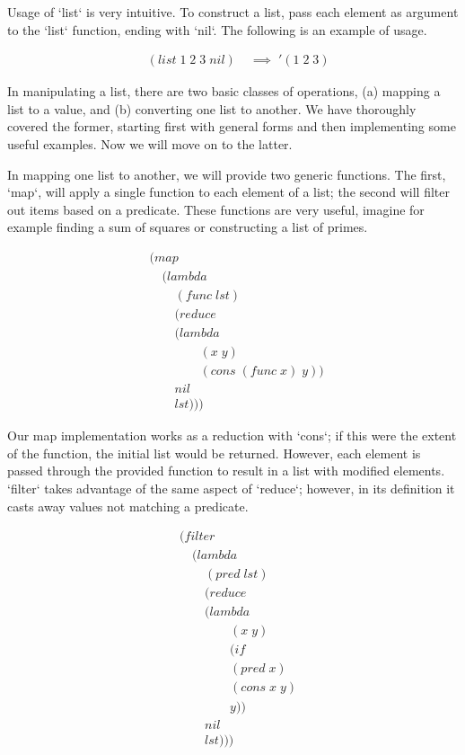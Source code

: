 \documentclass[11pt]{article}
\begin{document}
Usage of `list` is very intuitive. To construct a list, pass each element as argument to the `list` function, ending with `nil`. The following is an example of usage.   

\begin{align*}
& (list \; 1 \; 2 \; 3 \; nil) \; &\implies \; '(1 \; 2 \; 3)
\end{align*}

In manipulating a list, there are two basic classes of operations, (a) mapping a list to a value, and (b) converting one list to another. We have thoroughly covered the former, starting first with general forms and then implementing some useful examples. Now we will move on to the latter.

In mapping one list to another, we will provide two generic functions. The first, `map`, will apply a single function to each element of a list; the second will filter out items based on a predicate. These functions are very useful, imagine for example finding a sum of squares or constructing a list of primes.

\begin{align*}
& (map \; 
\\& \quad (lambda \; 
\\& \qquad (func \; lst)
\\& \qquad (reduce
\\& \qquad (lambda \; 
\\& \qquad \qquad (x \; y) \; 
\\& \qquad \qquad (cons \; (func \; x) \; y)) \; 
\\& \qquad nil
\\& \qquad lst)))
\end{align*}

Our map implementation works as a reduction with `cons`; if this were the extent of the function, the initial list would be returned. However, each element is passed through the provided function to result in a list with modified elements. `filter` takes advantage of the same aspect of `reduce`; however, in its definition it casts away values not matching a predicate.

\begin{align*}
& (filter \; 
\\& \quad (lambda \; 
\\& \qquad (pred \; lst)
\\& \qquad (reduce
\\& \qquad (lambda \; 
\\& \qquad \qquad (x \; y)
\\& \qquad \qquad (if
\\& \qquad \qquad (pred \; x)
\\& \qquad \qquad (cons \; x \; y)
\\& \qquad \qquad y))
\\& \qquad nil
\\& \qquad lst)))
\end{align*}
\end{document}
